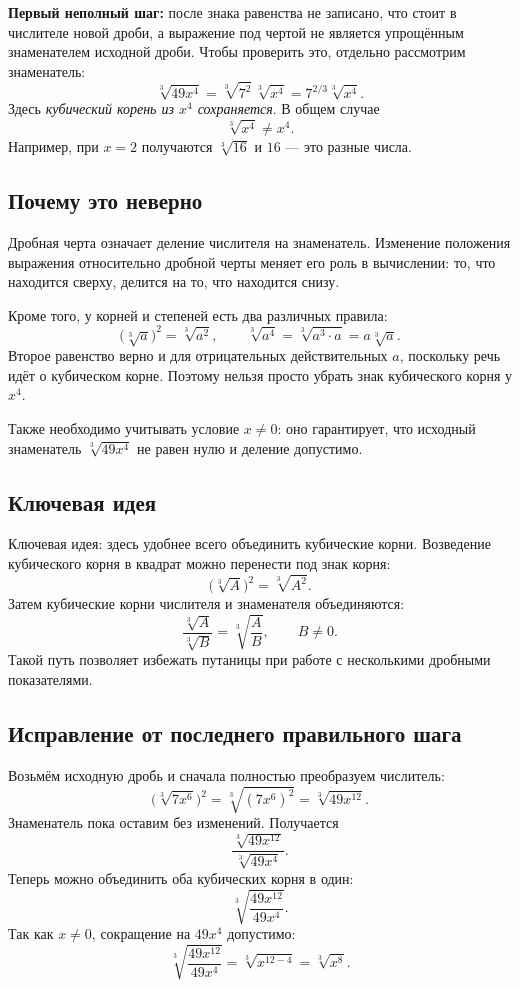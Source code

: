 \documentclass[11pt,a4paper]{article}
\begin{document}
\textbf{Первый неполный шаг:} после знака равенства не записано,
что стоит в числителе новой дроби, а выражение под чертой
не является упрощённым знаменателем исходной дроби.
Чтобы проверить это, отдельно рассмотрим знаменатель:
\[
\sqrt[3]{49x^4}
=\sqrt[3]{7^2}\,\sqrt[3]{x^4}
=7^{2/3}\sqrt[3]{x^4}.
\]
Здесь \emph{кубический корень из $x^4$ сохраняется}.
В общем случае
\[
\sqrt[3]{x^4}\ne x^4.
\]
Например, при $x=2$ получаются $\sqrt[3]{16}$ и $16$ ---
это разные числа.
\subsection*{Почему это неверно}
Дробная черта означает деление числителя на знаменатель.
Изменение положения выражения относительно дробной черты меняет
его роль в вычислении: то, что находится сверху, делится на то,
что находится снизу.

Кроме того, у корней и степеней есть два различных правила:
\[
\bigl(\sqrt[3]{a}\bigr)^2=\sqrt[3]{a^2},
\qquad
\sqrt[3]{a^4}=\sqrt[3]{a^3\cdot a}
=a\sqrt[3]{a}.
\]
Второе равенство верно и для отрицательных действительных $a$,
поскольку речь идёт о кубическом корне.
Поэтому нельзя просто убрать знак кубического корня у $x^4$.

Также необходимо учитывать условие $x\ne0$: оно гарантирует,
что исходный знаменатель $\sqrt[3]{49x^4}$ не равен нулю
и деление допустимо.
\subsection*{Ключевая идея}
\textcolor{blue!60!black}{Ключевая идея:} здесь удобнее всего
объединить кубические корни. Возведение кубического корня в квадрат
можно перенести под знак корня:
\[
\bigl(\sqrt[3]{A}\bigr)^2=\sqrt[3]{A^2}.
\]
Затем кубические корни числителя и знаменателя объединяются:
\[
\frac{\sqrt[3]{A}}{\sqrt[3]{B}}
=\sqrt[3]{\frac AB},\qquad B\ne0.
\]
Такой путь позволяет избежать путаницы при работе с несколькими
дробными показателями.
\subsection*{Исправление от последнего правильного шага}
Возьмём исходную дробь и сначала полностью преобразуем числитель:
\[
\bigl(\sqrt[3]{7x^6}\bigr)^2
=\sqrt[3]{(7x^6)^2}
=\sqrt[3]{49x^{12}}.
\]
Знаменатель пока оставим без изменений. Получается
\[
\frac{\sqrt[3]{49x^{12}}}{\sqrt[3]{49x^4}}.
\]
Теперь можно объединить оба кубических корня в один:
\[
\sqrt[3]{\frac{49x^{12}}{49x^4}}.
\]
Так как $x\ne0$, сокращение на $49x^4$ допустимо:
\[
\sqrt[3]{\frac{49x^{12}}{49x^4}}
=\sqrt[3]{x^{12-4}}=\sqrt[3]{x^8}.
\]
\end{document}
